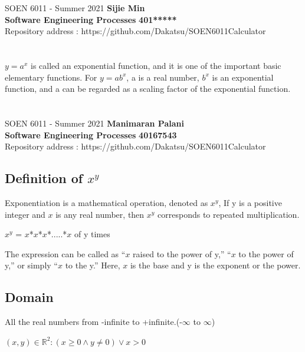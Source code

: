 \documentclass[a4paper, 11pt]{report}
\begin{document}
\section*{}
\normalsize {SOEN 6011 - Summer 2021} \hfill \textbf{Sijie Min} \\
\textbf{ Software Engineering Processes}  \hfill \textbf{401*****} \\
\hfill Repository address : https://github.com/Dakatsu/SOEN6011Calculator
\\\\\\
$y=a^x$ is called an exponential function, and it is one of the important basic elementary functions. For $y=ab^x$, a is a real number, $b^x$ is an exponential function, and a can be regarded as a scaling factor of the exponential function.
 \begin{center} 
\end{center}
\pagebreak

\newcommand{\R}{\mathbb{R}}
\renewcommand{\labelitemi}{$\star$}
\section*{}
\normalsize {SOEN 6011 - Summer 2021} \hfill \textbf{Manimaran Palani} \\
\textbf{ Software Engineering Processes}  \hfill \textbf{40167543} \\
\hfill Repository address : https://github.com/Dakatsu/SOEN6011Calculator
\subsection*{Definition of \(x^y\)}
\cite{mathInsight} Exponentiation is a mathematical operation, denoted as \(x^y\), If y is a positive integer and \(x\) is any real number, then \(x^y\) corresponds to repeated multiplication.
 \begin{center} \(x^y\) = \(x\)*\(x\)*\(x\)*.....*\(x\) of y times \end{center}
The expression can be called as “\(x\) raised to the power of y,” “\(x\) to the power of y,” or simply “\(x\) to the y.” Here, \(x\) is the base and y is the exponent or the power.
\subsection*{Domain}
\cite{mathbits} All the real numbers from -infinite to +infinite.(-\(\infty\) to \(\infty\))
 \begin{center} $(x,y) \in \R^2 : (x \geq 0 \land y \neq 0) \lor x>0$ \end{center}
\end{document}

